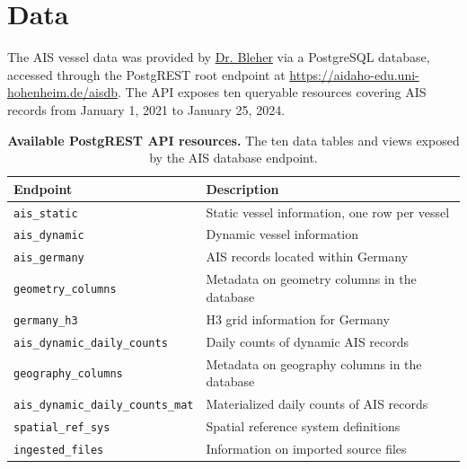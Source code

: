 \documentclass[10pt,a4paper]{article}
\begin{document}

\section{Data}
The AIS vessel data was provided by \href{https://johannes-bleher.de/}{Dr. Bleher} via a PostgreSQL database, accessed through the PostgREST 
root endpoint at \url{https://aidaho-edu.uni-hohenheim.de/aisdb}. The API exposes ten queryable resources covering AIS records from 
January 1, 2021 to January 25, 2024.

\begin{table}[ht]
\caption{\textbf{Available PostgREST API resources.} The ten data tables and views exposed by the AIS database endpoint.}
\label{tab:api-resources}
\vspace{0.2cm}
\centering
\small
\begin{tabular}{@{}p{}p{}@{}}
\toprule
{\bfseries Endpoint} & {\bfseries Description} \\
\midrule
\texttt{ais\_static} & Static vessel information, one row per vessel \\
\texttt{ais\_dynamic} & Dynamic vessel information \\
\texttt{ais\_germany} & AIS records located within Germany \\
\texttt{geometry\_columns} & Metadata on geometry columns in the database \\
\texttt{germany\_h3} & H3 grid information for Germany \\
\texttt{ais\_dynamic\_daily\_counts} & Daily counts of dynamic AIS records \\
\texttt{geography\_columns} & Metadata on geography columns in the database \\
\texttt{ais\_dynamic\_daily\_counts\_mat} & Materialized daily counts of AIS records \\
\texttt{spatial\_ref\_sys} & Spatial reference system definitions \\
\texttt{ingested\_files} & Information on imported source files \\
\bottomrule
\end{tabular}
\end{table}

\end{document}
